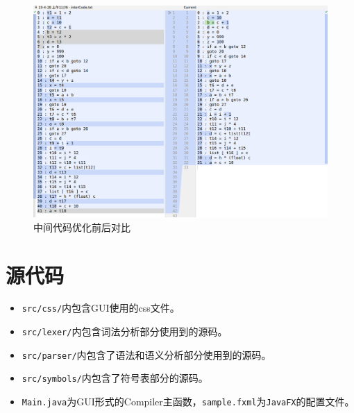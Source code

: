 \documentclass{ML}
\begin{document}
\begin{figure}[htb]
    \centering
    \includegraphics[width=1\linewidth]{media/contract.png}
    \caption{中间代码优化前后对比}\label{fig:contract}
\end{figure}

\appendix

\section{源代码}
\begin{itemize}
    \item \texttt{src/css/}内包含GUI使用的css文件。
    \item \texttt{src/lexer/}内包含词法分析部分使用到的源码。
    \item \texttt{src/parser/}内包含了语法和语义分析部分使用到的源码。
    \item \texttt{src/symbols/}内包含了符号表部分的源码。
    \item \texttt{Main.java}为GUI形式的Compiler主函数，\texttt{sample.fxml}为\texttt{JavaFX}的配置文件。
\end{itemize}
\end{document}
